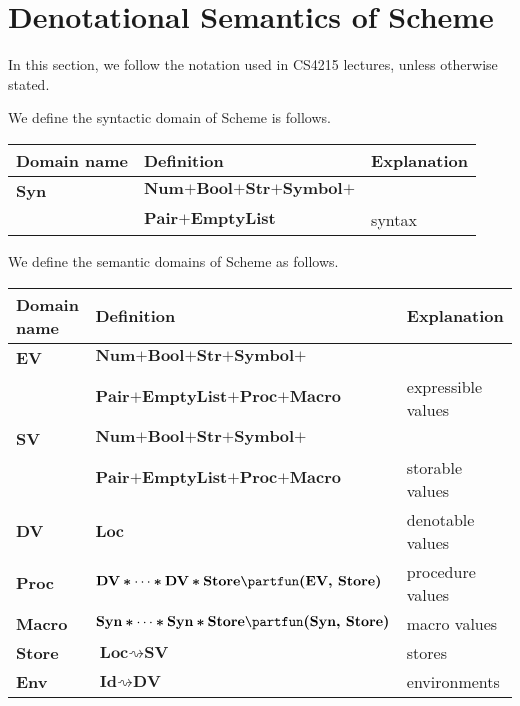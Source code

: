 \documentclass{article}
\begin{document}
\section{Denotational Semantics of Scheme}
In this section, we follow the notation used in CS4215 lectures, unless otherwise stated.

We define the syntactic domain of Scheme is follows.
\begin{center}
\begin{tabular}{|l|ll|} \hline
Domain name & Definition & Explanation\\ \hline
\textbf{Syn} & $\textbf{Num} \boldsymbol{+} \textbf{Bool} \boldsymbol{+} \textbf{Str} \boldsymbol{+} \textbf{Symbol} \boldsymbol{+} $ & \\
            & $\textbf{Pair} \boldsymbol{+} \textbf{EmptyList}$  & syntax \\ \hline
\end{tabular}
\end{center}

We define the semantic domains of Scheme as follows.
\begin{center}
\begin{tabular}{|l|ll|} \hline
Domain name & Definition & Explanation\\ \hline
\textbf{EV} & $\textbf{Num} \boldsymbol{+} \textbf{Bool} \boldsymbol{+} \textbf{Str} \boldsymbol{+} \textbf{Symbol} \boldsymbol{+} $ & \\
            & $\textbf{Pair} \boldsymbol{+} \textbf{EmptyList} \boldsymbol{+} \textbf{Proc} \boldsymbol{+} \textbf{Macro}$  & expressible values\\
\textbf{SV} & $\textbf{Num} \boldsymbol{+} \textbf{Bool} \boldsymbol{+} \textbf{Str} \boldsymbol{+} \textbf{Symbol} \boldsymbol{+} $ & \\
            & $\textbf{Pair} \boldsymbol{+} \textbf{EmptyList} \boldsymbol{+} \textbf{Proc} \boldsymbol{+} \textbf{Macro}$  & storable values\\
\textbf{DV} & $\textbf{Loc}$ & denotable values \\
\textbf{Proc}   & $\textbf{DV} \boldsymbol{*} \cdots \boldsymbol{*} \textbf{DV} \boldsymbol{*} \textbf{Store} \partfun \textbf{(EV, Store)}$ & procedure values \\
\textbf{Macro}   & $\textbf{Syn} \boldsymbol{*} \cdots \boldsymbol{*} \textbf{Syn} \boldsymbol{*} \textbf{Store} \partfun \textbf{(Syn, Store)}$ & macro values \\
\textbf{Store} & $\textbf{Loc} \rightsquigarrow \textbf{SV}$ & stores\\
\textbf{Env} & $\textbf{Id} \rightsquigarrow \textbf{DV}$ & environments\\ \hline
\end{tabular}
\end{center}
\end{document}
